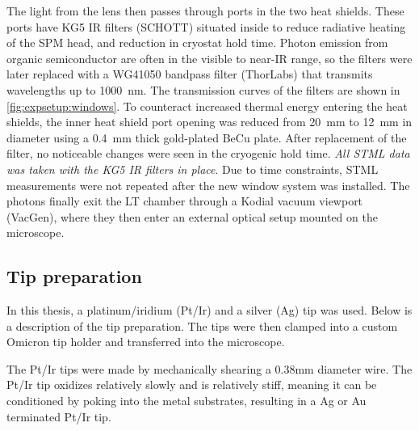 The light from the lens then passes through ports in the two heat shields. These ports have KG5 \ac{IR} filters (SCHOTT) situated inside to reduce radiative heating of the \ac{SPM} head, and reduction in cryostat hold time. Photon emission from organic semiconductor are often in the visible to near-\ac{IR} range, so the filters were later replaced with a WG41050 bandpass filter  (ThorLabs) that transmits wavelengths up to \SI{1000}{nm}. The transmission curves of the filters are shown in \autoref{fig:expsetup:windows}. To counteract increased thermal energy entering the heat shields, the inner heat shield port opening was reduced from \SI{20}{mm} to \SI{12}{mm} in diameter using a \SI{0.4}{mm} thick gold-plated BeCu plate. After replacement of the filter, no noticeable changes were seen in the cryogenic hold time. \emph{All \ac{STML} data was taken with the KG5 \ac{IR} filters in place}. Due to time constraints, \ac{STML} measurements were not repeated after the new window system was installed. The photons finally exit the \ac{LT} chamber through a Kodial vacuum viewport (VacGen), where they then enter an external optical setup mounted on the microscope. 



\subsection{Tip preparation}

In this thesis, a platinum/iridium (Pt/Ir) and a silver (Ag) tip was used. Below is a description of the tip preparation. The tips were then clamped into a custom Omicron tip holder and transferred into the microscope. 

The Pt/Ir tips were made by mechanically shearing a 0.38mm diameter wire. The Pt/Ir tip oxidizes relatively slowly and is relatively stiff, meaning it can be conditioned by poking into the metal substrates, resulting in a Ag or Au terminated Pt/Ir tip. 

